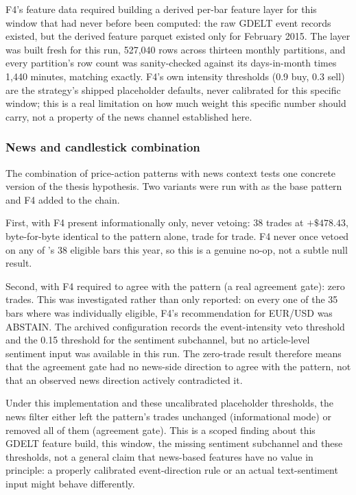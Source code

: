 F4's feature data required building a derived per-bar feature layer for this window that had never before been computed: the raw GDELT event records existed, but the derived feature parquet existed only for February 2015. The layer was built fresh for this run, 527,040 rows across thirteen monthly partitions, and every partition's row count was sanity-checked against its days-in-month times 1,440 minutes, matching exactly. F4's own intensity thresholds (0.9 buy, 0.3 sell) are the strategy's shipped placeholder defaults, never calibrated for this specific window; this is a real limitation on how much weight this specific number should carry, not a property of the news channel established here.

\subsubsection{News and candlestick combination} \label{subsec:news-candlestick-combination}

The combination of price-action patterns with news context tests one concrete version of the thesis hypothesis. Two variants were run with  as the base pattern and F4 added to the chain.

First, with F4 present informationally only, never vetoing: 38 trades at $+\$478.43$, byte-for-byte identical to the pattern alone, trade for trade. F4 never once vetoed on any of 's 38 eligible bars this year, so this is a genuine no-op, not a subtle null result.

Second, with F4 required to agree with the pattern (a real agreement gate): zero trades. This was investigated rather than only reported: on every one of the 35 bars where  was individually eligible, F4's recommendation for EUR/USD was ABSTAIN. The archived configuration records the event-intensity veto threshold and the 0.15 threshold for the sentiment subchannel, but no article-level sentiment input was available in this run. The zero-trade result therefore means that the agreement gate had no news-side direction to agree with the pattern, not that an observed news direction actively contradicted it.

Under this implementation and these uncalibrated placeholder thresholds, the news filter either left the pattern's trades unchanged (informational mode) or removed all of them (agreement gate). This is a scoped finding about this GDELT feature build, this window, the missing sentiment subchannel and these thresholds, not a general claim that news-based features have no value in principle: a properly calibrated event-direction rule or an actual text-sentiment input might behave differently.


